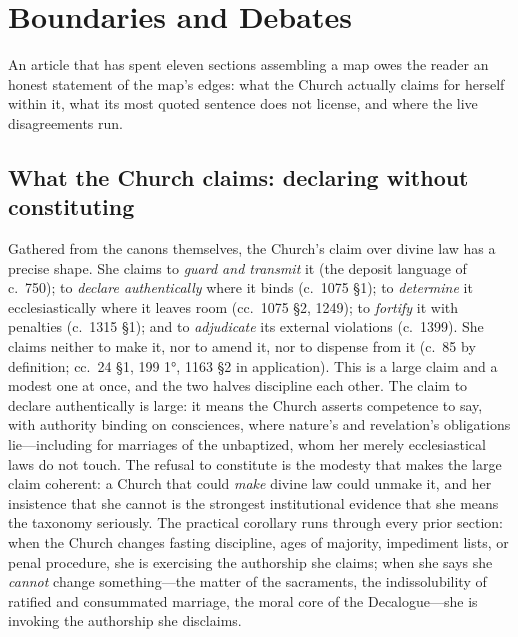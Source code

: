 \section{Boundaries and Debates}

An article that has spent eleven sections assembling a map owes the reader an honest statement of the map's edges: what the Church actually claims for herself within it, what its most quoted sentence does not license, and where the live disagreements run.

\subsection{What the Church claims: declaring without constituting}

Gathered from the canons themselves, the Church's claim over divine law has a precise shape. She claims to \emph{guard and transmit} it (the deposit language of c.~750); to \emph{declare authentically} where it binds (c.~1075 §1); to \emph{determine} it ecclesiastically where it leaves room (cc.~1075 §2, 1249); to \emph{fortify} it with penalties (c.~1315 §1); and to \emph{adjudicate} its external violations (c.~1399). She claims neither to make it, nor to amend it, nor to dispense from it (c.~85 by definition; cc.~24 §1, 199 1°, 1163 §2 in application). This is a large claim and a modest one at once, and the two halves discipline each other. The claim to declare authentically is large: it means the Church asserts competence to say, with authority binding on consciences, where nature's and revelation's obligations lie---including for marriages of the unbaptized, whom her merely ecclesiastical laws do not touch. The refusal to constitute is the modesty that makes the large claim coherent: a Church that could \emph{make} divine law could unmake it, and her insistence that she cannot is the strongest institutional evidence that she means the taxonomy seriously. The practical corollary runs through every prior section: when the Church changes fasting discipline, ages of majority, impediment lists, or penal procedure, she is exercising the authorship she claims; when she says she \emph{cannot} change something---the matter of the sacraments, the indissolubility of ratified and consummated marriage, the moral core of the Decalogue---she is invoking the authorship she disclaims.

